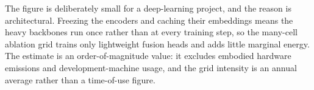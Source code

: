 \documentclass[a4paper,12pt]{article}
\begin{document}
The figure is deliberately small for a deep-learning project, and the reason is architectural. Freezing the encoders and caching their embeddings means the heavy backbones run once rather than at every training step, so the many-cell ablation grid trains only lightweight fusion heads and adds little marginal energy. The estimate is an order-of-magnitude value: it excludes embodied hardware emissions and development-machine usage, and the grid intensity is an annual average rather than a time-of-use figure.

\newpage

\medskip



\clearpage
\newpage

\begin{appendices}


\end{appendices}
\end{document}

